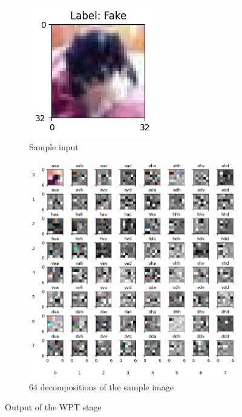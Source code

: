 \documentclass{svproc}
\begin{document}
\begin{figure}[H]
  \centering
  \begin{subfigure}{0.25\textwidth}
    \centering
    \includegraphics[width=0.9\linewidth]{figures/exp1_img1.png}
    \caption{Sample input}
    \label{fig:exp1_sub1}
  \end{subfigure}%

  \bigskip
  
  \begin{subfigure}{0.7\textwidth}
    \centering
    \includegraphics[width=0.9\linewidth]{figures/exp1_img1_wpt_dec.png}
    \caption{64 decompositions of the sample image}
    \label{fig:exp1_sub2}
  \end{subfigure}

  \caption{Output of the WPT stage}
  \label{fig:db2_dec_exp1}
\end{figure}
\end{document}
